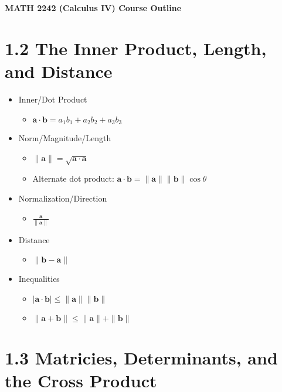 \documentclass[11pt]{article}
\theoremstyle{plain}
\theoremstyle{definition}
\theoremstyle{remark}
\newcommand{\vect}[1]{\mathbf{#1}}
\newcommand{\<}{\langle}
\renewcommand{\>}{\rangle}
\begin{document}
\noindent\textbf{
  MATH 2242 (Calculus IV) Course Outline
}

\section*{1.2 The Inner Product, Length, and Distance}

\begin{itemize}
  \item Inner/Dot Product
    \begin{itemize}
      \item \(\vect{a}\cdot\vect{b}=a_1b_1+a_2b_2+a_3b_3\)
    \end{itemize}
  \item Norm/Magnitude/Length
    \begin{itemize}
      \item \(\|\vect{a}\|=\sqrt{\vect{a}\cdot\vect{a}}\)
      \item Alternate dot product:
            \(\vect{a}\cdot\vect{b}=\|\vect{a}\|\|\vect{b}\|\cos\theta\)
    \end{itemize}
  \item Normalization/Direction
    \begin{itemize}
      \item \(\frac{\vect{a}}{\|\vect{a}\|}\)
    \end{itemize}
  \item Distance
    \begin{itemize}
      \item \(\|\vect{b}-\vect{a}\|\)
    \end{itemize}
  \item Inequalities
    \begin{itemize}
      \item \(|\vect{a}\cdot\vect{b}|\leq\|\vect{a}\|\|\vect{b}\|\)
      \item \(\|\vect{a}+\vect{b}\|\leq\|\vect{a}\|+\|\vect{b}\|\)
    \end{itemize}
\end{itemize}

\section*{1.3 Matricies, Determinants, and the Cross Product}
\end{document}

